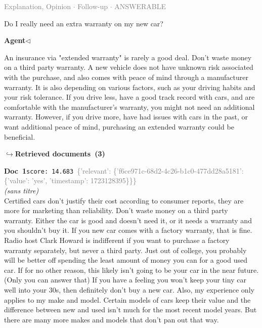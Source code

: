 \documentclass[a4paper,11pt]{article}
\begin{document}
\vspace{0.5em}
\hfill{\tiny\textcolor{gray}{Explanation, Opinion $\cdot$ Follow-up $\cdot$ ANSWERABLE}}
\begin{userbubble}
Do I really need an extra warranty on my new car?
\end{userbubble}
\noindent\hfill{\small\textcolor{agentcolor}{\textbf{Agent\enspace$\triangleleft$}}}
\begin{agentbubble}
 An insurance via "extended warranty" is rarely a good deal.  Don't waste money on a third party warranty.  A new vehicle does not have unknown risk associated with the purchase, and also comes with peace of mind through a manufacturer warranty.  It is also depending on various factors, such as your driving habits and your risk tolerance.  If you drive less, have a good track record with cars, and are comfortable with the manufacturer's warranty, you might not need an additional warranty. However, if you drive more, have had issues with cars in the past, or want additional peace of mind, purchasing an extended warranty could be beneficial. 
\end{agentbubble}
\noindent\hfill{\footnotesize\textcolor{doccolor}{\textbf{$\hookrightarrow$\enspace Retrieved documents~(3)}}}
\begin{docenv}
{\footnotesize\textcolor{doccolor}{\textbf{Doc~1}}}\hfill{\tiny\texttt{score:~14.683}}\ {\tiny\textcolor{gray}{\{'relevant': \{'f6ce971c-68d2-4c26-b1c0-477dd28a5181': \{'value': 'yes', 'timestamp': 1723128395\}\}\}}}\\[3pt]
{\small\textit{(sans titre)}}\\[2pt]
\vspace{2pt}
{\footnotesize 
Certified cars don't justify their cost according to consumer reports, they are more for marketing than reliability. Don't waste money on a third party warranty. Either the car is good and doesn't need it, or it needs a warranty and you shouldn't buy it. If you new car comes with a factory warranty, that is fine. Radio host Clark Howard is indifferent if you want to purchase a factory warranty separately, but never a third party. Just out of college, you probably will be better off spending the least amount of money you can for a good used car. If for no other reason, this likely isn't going to be your car in the near future. (Only you can answer that) If you have a feeling you won't keep your tiny car well into your 30s, then definitely don't buy a new car. Also, my experience only applies to my make and model. Certain models of cars keep their value and the difference between new and used isn't much for the most recent model years. But there are many more makes and models that don't pan out that way.}
\end{docenv}
\end{document}
